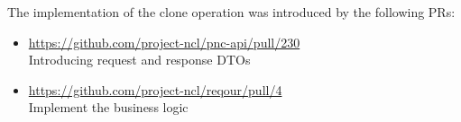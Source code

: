 \documentclass[../main.tex]{subfiles}
\begin{document}
The implementation of the clone operation was introduced by the following PRs:

\begin{itemize}
    \item \url{https://github.com/project-ncl/pnc-api/pull/230}\\
    Introducing request and response DTOs

    \item \url{https://github.com/project-ncl/reqour/pull/4}\\
    Implement the business logic
\end{itemize}
\end{document}
